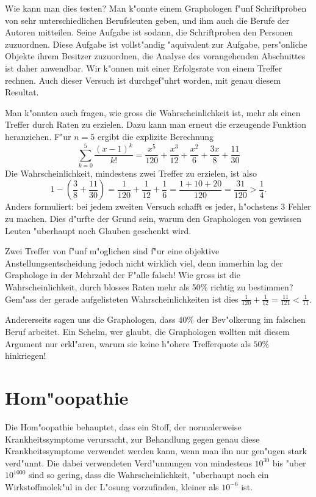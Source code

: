Wie kann man dies testen? Man k"onnte einem Graphologen f"unf Schriftproben
von sehr unterschiedlichen Berufsleuten geben, und ihm auch die Berufe
der Autoren mitteilen.
Seine Aufgabe ist sodann, die Schriftproben den
Personen zuzuordnen.
Diese Aufgabe ist vollst"andig "aquivalent zur Aufgabe,
pers"onliche Objekte ihrem Besitzer zuzuordnen, die Analyse des vorangehenden
Abschnittes ist daher anwendbar.
Wir k"onnen mit einer Erfolgsrate von einem
Treffer rechnen.
Auch dieser Versuch ist durchgef"uhrt worden, mit genau
diesem Resultat.

Man k"onnten auch fragen, wie gross die Wahrscheinlichkeit ist, mehr als einen
Treffer durch Raten zu erzielen.
Dazu kann man erneut die erzeugende Funktion
heranziehen.
F"ur $n=5$ ergibt die explizite Berechnung
$$\sum_{k=0}^5\frac{(x-1)^k}{k!}
=\frac{x^5}{120}+\frac{x^3}{12}+\frac{x^2}{6}+\frac{3 x}{8}+\frac{11}{30}
$$
Die Wahrscheinlichkeit, mindestens zwei Treffer zu erzielen, ist also
$$1-\left(\frac38+\frac{11}{30}\right)=\frac1{120}+\frac1{12}+\frac16=\frac{1+10+20}{120}=\frac{31}{120}>\frac14.$$
Anders formuliert: bei jedem zweiten Versuch schafft es jeder, h"ochstens $3$
Fehler zu machen.
Dies d"urfte der Grund sein, warum den Graphologen
von gewissen Leuten "uberhaupt noch Glauben geschenkt wird.

Zwei Treffer von f"unf m"oglichen sind f"ur eine objektive Anstellungsentscheidung
jedoch nicht wirklich viel, denn immerhin lag der Graphologe in der Mehrzahl
der F"alle falsch! Wie gross ist die Wahrscheinlichkeit, durch blosses Raten
mehr als 50\% richtig zu bestimmen? Gem"ass der gerade
aufgelisteten Wahrscheinlichkeiten ist dies
$\frac1{120}+\frac1{12}=\frac{11}{121}<\frac1{11}$.

Andererseits sagen uns die Graphologen, dass 40\% der Bev"olkerung im falschen
Beruf arbeitet.
Ein Schelm, wer glaubt,
die Graphologen wollten mit diesem
Argument nur erkl"aren, warum sie keine h"ohere Trefferquote als $50\%$ hinkriegen!


\section{Hom"oopathie}
Die Hom"oopathie behauptet, dass ein Stoff, der normalerweise Krankheitssymptome
verursacht, zur Behandlung gegen genau diese Krankheitssymptome verwendet werden
kann, wenn man ihn nur gen"ugen stark verd"unnt.
Die dabei verwendeten
Verd"unnungen von mindestens $10^{30}$ bis "uber $10^{1000}$ sind so gering,
dass die Wahrscheinlichkeit, "uberhaupt noch ein Wirkstoffmolek"ul in der
L"osung vorzufinden, kleiner als $10^{-6}$ ist.

